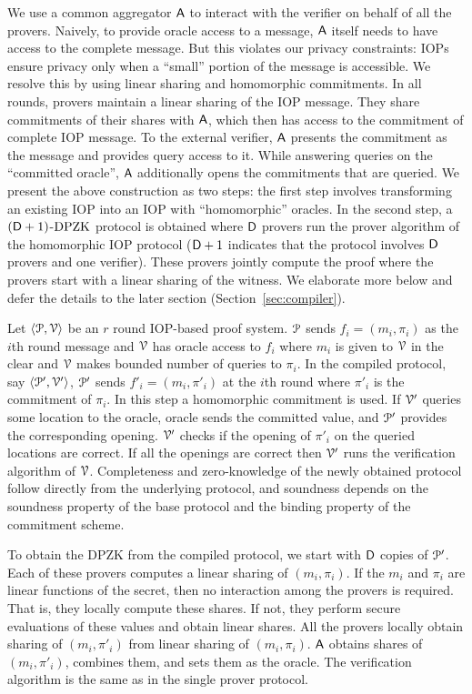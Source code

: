 We use a common aggregator $\mathsf{A}$ to interact with the verifier on behalf of all the provers. Naively, to provide oracle access to a message, $\mathsf{A}$ itself needs to have access to the complete message. But this violates our privacy constraints: IOPs ensure privacy only when a ``small'' portion of the message is accessible. We resolve this  by using linear sharing and homomorphic commitments. In all rounds, provers maintain a linear sharing of the IOP message. They share commitments of their shares with $\mathsf{A}$, which then has access to the commitment of complete IOP message. To the external verifier, $\mathsf{A}$ presents the commitment as the message and provides query access to it. While answering queries on the ``committed oracle'', $\mathsf{A}$ additionally opens the commitments that are queried. We present the above construction as two steps: the first step involves transforming an existing IOP into an IOP with ``homomorphic'' oracles. In the second step, a $(\mathsf{D} + 1)$-$\text{DPZK}$ protocol is obtained where $\mathsf{D}$ provers run the prover algorithm of the homomorphic IOP protocol ($\mathsf{D}+1$ indicates that the protocol involves $\mathsf{D}$ provers and one verifier). These provers jointly compute the proof where the provers start with a linear sharing of the witness.  We elaborate more below and defer the details to the later section (Section~\ref{sec:compiler}).


Let $\langle \mathcal{P},\mathcal{V}\rangle$ be an $r$ round IOP-based proof system. $\mathcal{P}$ sends $f_i = (m_i, \pi_i)$ as the $i$th round message and $\mathcal{V}$ has oracle access to $f_i$ where $m_i$ is given to $\mathcal{V}$ in the clear and $\mathcal{V}$ makes bounded number of queries to $\pi_i$. In the compiled protocol, say $\langle \mathcal{P}',\mathcal{V}'\rangle$, $\mathcal{P}'$ sends $f'_i = (m_i, \pi'_i)$ at the $i$th round where $\pi'_i$ is the commitment of $\pi_i$. In this step a homomorphic commitment is used. If $\mathcal{V}'$ queries some location to the oracle, oracle sends the committed value, and $\mathcal{P}'$ provides the corresponding opening. $\mathcal{V}'$ checks if the opening of $\pi'_i$ on the queried locations are correct. If all the openings are correct then $\mathcal{V}'$ runs the verification algorithm of $\mathcal{V}$. Completeness and zero-knowledge of the newly obtained protocol follow directly from the underlying protocol, and soundness depends on the soundness property of the base protocol and the binding property of the commitment scheme.

To obtain the DPZK from the compiled protocol, we start with $\mathsf{D}$ copies of $\mathcal{P}'$. Each of these provers computes a linear sharing of $(m_i, \pi_i)$. If the $m_i$ and $\pi_i$ are linear functions of the secret, then no interaction among the provers is required. That is, they locally compute these shares. If not, they perform secure evaluations of these values and obtain linear shares. All the provers locally obtain sharing of $(m_i, \pi'_i)$ from linear sharing of $(m_i,\pi_i)$. $\mathsf{A}$ obtains shares of $(m_i, \pi'_i)$, combines them, and sets them as the oracle. The verification algorithm is the same as in the single prover protocol.

